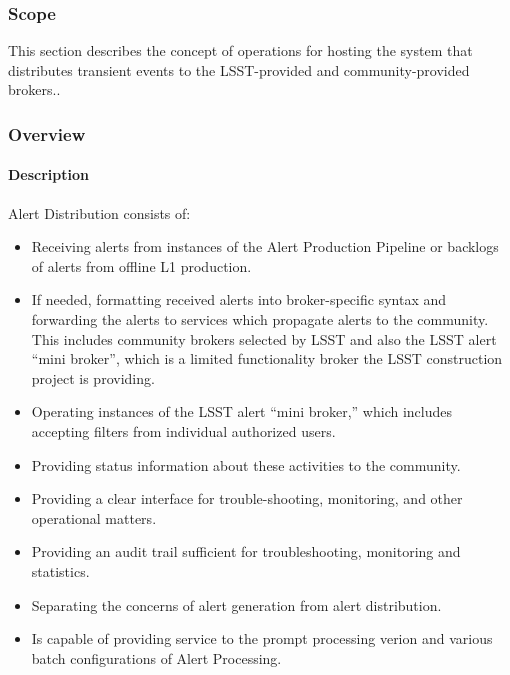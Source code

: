 \subsubsection{Scope}
This section describes the concept of operations for hosting the system that distributes transient events to the LSST-provided and community-provided brokers..

\subsubsection{Overview}

\paragraph{Description}

Alert Distribution consists of:
\begin{itemize}

\item Receiving alerts from instances of the Alert Production Pipeline or backlogs of alerts from offline L1 production.

\item If needed, formatting received alerts into broker-specific syntax and forwarding the alerts to services which propagate alerts to the community. This includes  community brokers selected by LSST and also  the LSST alert “mini broker”, which is a limited functionality broker the LSST construction project is providing.

\item Operating instances of the LSST alert “mini broker,” which includes accepting filters from individual authorized users.

\item Providing status information about these activities to the community.

\item Providing a clear interface for trouble-shooting, monitoring, and other operational matters.

\item Providing an audit trail sufficient for troubleshooting, monitoring and statistics.

\item Separating the concerns of alert generation from alert distribution.

\item Is capable of providing service to the prompt processing verion and various batch configurations of Alert Processing.

\end{itemize}

